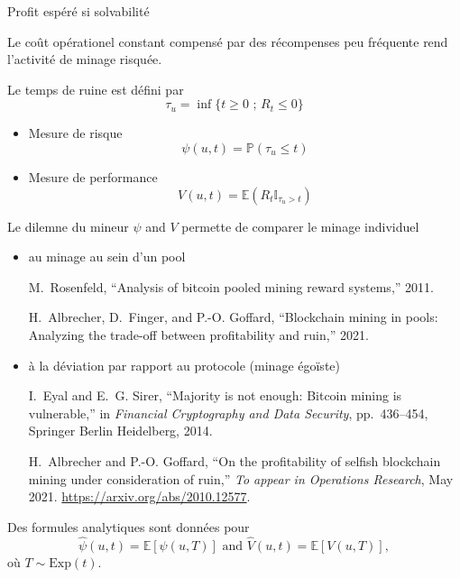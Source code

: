 \documentclass{beamer}
\begin{document}
\begin{frame}{Profit espéré si solvabilité}
\scriptsize

\begin{tcolorbox}[enhanced,drop shadow, title=Remarque]
Le coût opérationel constant compensé par des récompenses peu fréquente rend l'activité de minage risquée.
\end{tcolorbox}
Le temps de ruine est défini par
$$
\tau_u  = \inf\{t\geq0\text{ ; }R_t \leq0\}
$$
\begin{itemize}
  \item Mesure de risque
  $$
  \psi(u,t) = \mathbb{P}(\tau_u \leq t)
  $$
  \item Mesure de performance
  $$
  V(u,t) = \mathbb{E}(R_t\mathbb{I}_{\tau_u > t})
  $$
\end{itemize} 
\end{frame}
\begin{frame}{Le dilemne du mineur} 
\scriptsize
$\psi$ and $V$ permette de comparer le minage individuel
\begin{itemize}
  \item au minage au sein d'un pool
\tiny
  \begin{thebibliography}{1}

M.~Rosenfeld, ``Analysis of bitcoin pooled mining reward systems,'' 2011.

H.~Albrecher, D.~Finger, and P.-O. Goffard, ``Blockchain mining in pools:
  Analyzing the trade-off between profitability and ruin,'' 2021.


\end{thebibliography}
  \item \scriptsize à la déviation par rapport au protocole (minage égoïste)

  \tiny
  \begin{thebibliography}{1}
I.~Eyal and E.~G. Sirer, ``Majority is not enough: Bitcoin mining is
  vulnerable,'' in {\em Financial Cryptography and Data Security},
  pp.~436--454, Springer Berlin Heidelberg, 2014.

H.~Albrecher and P.-O. Goffard, ``{On the profitability of selfish blockchain
  mining under consideration of ruin},'' {\em To appear in Operations
  Research}, May 2021.
\newblock \url{https://arxiv.org/abs/2010.12577}.
\end{thebibliography}
\end{itemize}
Des formules analytiques sont données pour 
$$
\widehat{\psi}(u,t)= \mathbb{E}[\psi(u,T)]\text{ and }\widehat{V}(u,t)= \mathbb{E}[V(u,T)],
$$
où $T\sim\text{Exp}(t)$.
\end{frame}
\end{document}
